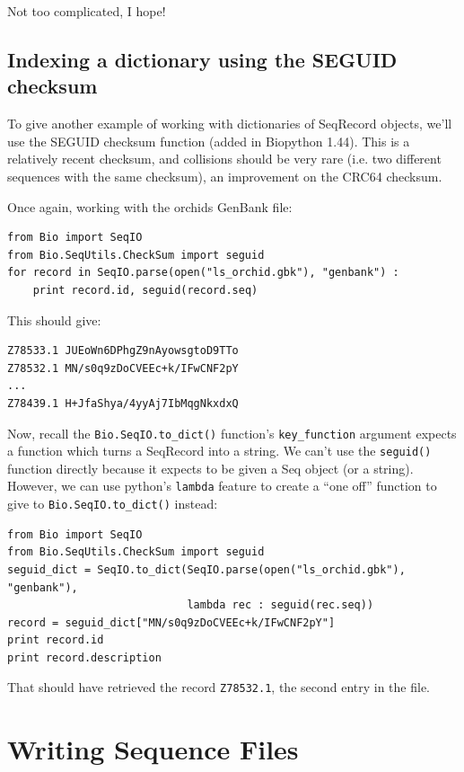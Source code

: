 \documentclass{report}
\begin{document}
\noindent Not too complicated, I hope!

\subsection{Indexing a dictionary using the SEGUID checksum}

To give another example of working with dictionaries of SeqRecord objects, we'll use the SEGUID checksum function (added in Biopython 1.44).  This is a relatively recent checksum, and collisions should be very rare (i.e. two different sequences with the same checksum), an improvement on the CRC64 checksum.

Once again, working with the orchids GenBank file:

\begin{verbatim}
from Bio import SeqIO
from Bio.SeqUtils.CheckSum import seguid
for record in SeqIO.parse(open("ls_orchid.gbk"), "genbank") :
    print record.id, seguid(record.seq)
\end{verbatim}

\noindent This should give:

\begin{verbatim}
Z78533.1 JUEoWn6DPhgZ9nAyowsgtoD9TTo
Z78532.1 MN/s0q9zDoCVEEc+k/IFwCNF2pY
...
Z78439.1 H+JfaShya/4yyAj7IbMqgNkxdxQ
\end{verbatim}

Now, recall the \verb|Bio.SeqIO.to_dict()| function's \verb|key_function| argument expects a function which turns a SeqRecord into a string.  We can't use the \verb|seguid()| function directly because it expects to be given a Seq object (or a string).  However, we can use python's \verb|lambda| feature to create a ``one off'' function to give to \verb|Bio.SeqIO.to_dict()| instead:

\begin{verbatim}
from Bio import SeqIO
from Bio.SeqUtils.CheckSum import seguid
seguid_dict = SeqIO.to_dict(SeqIO.parse(open("ls_orchid.gbk"), "genbank"),
                            lambda rec : seguid(rec.seq))
record = seguid_dict["MN/s0q9zDoCVEEc+k/IFwCNF2pY"]
print record.id
print record.description
\end{verbatim}

\noindent That should have retrieved the record {\tt Z78532.1}, the second entry in the file.

\section{Writing Sequence Files}
\end{document}
